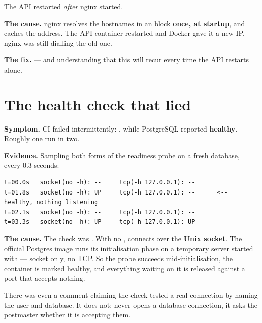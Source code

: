 The API restarted \emph{after} nginx started.

\textbf{The cause.} nginx resolves the hostnames in an  block
\textbf{once, at startup}, and caches the address. The API container restarted
and Docker gave it a new IP. nginx was still dialling the old one.

\textbf{The fix.}  --- and understanding that
this will recur every time the API restarts alone.


\section{The health check that lied}

\textbf{Symptom.} CI failed intermittently: , while PostgreSQL reported \textbf{healthy}. Roughly one
run in two.

\textbf{Evidence.} Sampling both forms of the readiness probe on a fresh
database, every 0.3 seconds:

\begin{lstlisting}
t=00.0s   socket(no -h): --     tcp(-h 127.0.0.1): --
t=01.8s   socket(no -h): UP     tcp(-h 127.0.0.1): --      <-- healthy, nothing listening
t=02.1s   socket(no -h): --     tcp(-h 127.0.0.1): --
t=03.3s   socket(no -h): UP     tcp(-h 127.0.0.1): UP
\end{lstlisting}

\textbf{The cause.} The check was . With no ,  connects over the
\textbf{Unix socket}. The official Postgres image runs its initialisation phase
on a temporary server started with  --- socket only,
no TCP. So the probe succeeds mid-initialisation, the container is marked
healthy, and everything waiting on it is released against a port that accepts
nothing.

There was even a comment claiming the check tested a real connection by naming
the user and database. It does not:  never opens a database
connection, it asks the postmaster whether it is accepting them.

